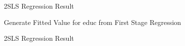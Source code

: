 2SLS Regression Result
\begin{stlog}\end{stlog}
Generate Fitted Value for educ from First Stage Regression
\begin{stlog}\end{stlog}
2SLS Regression Result
\begin{stlog}\end{stlog}
